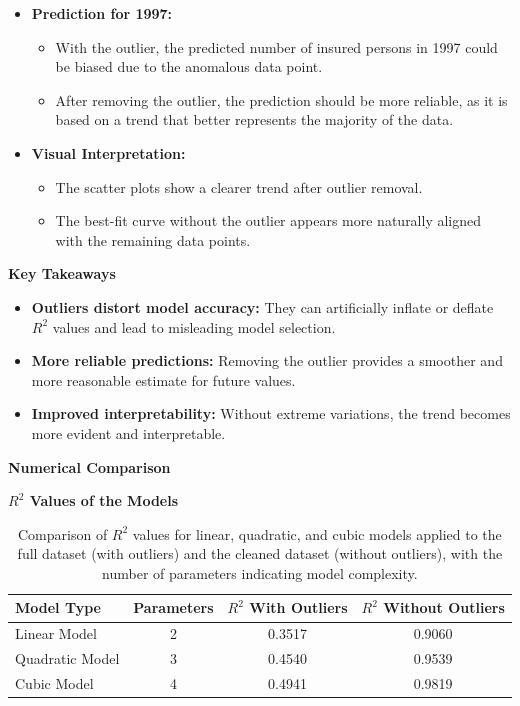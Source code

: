 \documentclass[12pt]{article}
\begin{document}
\begin{itemize}
    \item \textbf{Prediction for 1997:}
    \begin{itemize}
        \item With the outlier, the predicted number of insured persons in 1997 could be biased due to the anomalous data point.
        \item After removing the outlier, the prediction should be more reliable, as it is based on a trend that better represents the majority of the data.
    \end{itemize}
\newpage
    \item \textbf{Visual Interpretation:}
    \begin{itemize}
        \item The scatter plots show a clearer trend after outlier removal.
        \item The best-fit curve without the outlier appears more naturally aligned with the remaining data points.
    \end{itemize}
\end{itemize}

\textbf{Key Takeaways}

\begin{itemize}
    \item \textbf{Outliers distort model accuracy:} They can artificially inflate or deflate \( R^2 \) values and lead to misleading model selection.
    \item \textbf{More reliable predictions:} Removing the outlier provides a smoother and more reasonable estimate for future values.
    \item \textbf{Improved interpretability:} Without extreme variations, the trend becomes more evident and interpretable.
\end{itemize}

\textbf{Numerical Comparison}

\textbf{\( R^2 \) Values of the Models}

\begin{table}[h!]
    \centering
    \begin{tabular}{lccc}
        \toprule
        \textbf{Model Type} & \textbf{Parameters} & \textbf{\( R^2 \) With Outliers} & \textbf{\( R^2 \) Without Outliers} \\
        \midrule
        Linear Model    & 2 & 0.3517 & 0.9060 \\
        Quadratic Model & 3 & 0.4540 & 0.9539 \\
        Cubic Model     & 4 & 0.4941 & 0.9819 \\
        \bottomrule
    \end{tabular}
    \caption{Comparison of \( R^2 \) values for linear, quadratic, and cubic models applied to the full dataset (with outliers) and the cleaned dataset (without outliers), with the number of parameters indicating model complexity.}
    \label{tab:r2_comparison_params}
\end{table}
\end{document}
